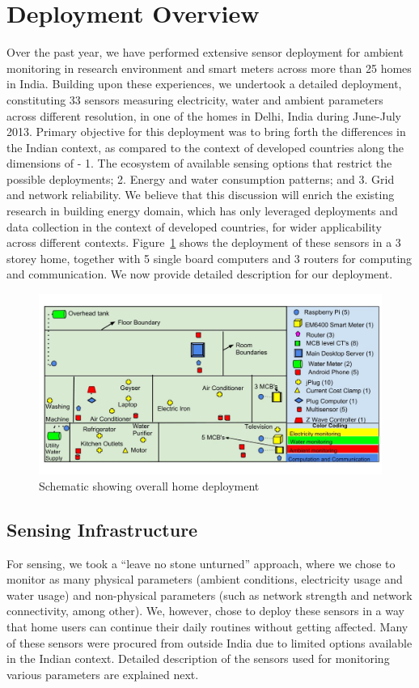\documentclass[10pt]{sensys-proc}
\newcommand{\figref}[1]{Figure~\ref{#1}}
\begin{document}
\section{Deployment Overview}
Over the past year, we have performed extensive sensor deployment for ambient monitoring in research environment and smart meters across more than 25 homes in India. Building upon these experiences, we undertook a detailed deployment, constituting 33 sensors measuring electricity, water and ambient parameters across different resolution, in one of the homes in Delhi, India during June-July 2013. Primary objective for this deployment was to bring forth the differences in the Indian context, as compared to the context of developed countries along the dimensions of - 1. The ecosystem of available sensing options that restrict the possible deployments; 2. Energy and water consumption patterns; and 3. Grid and network reliability. We believe that this discussion will enrich the existing research in building energy domain, which has only leveraged deployments and data collection in the context of developed countries, for wider applicability across different contexts. \figref{fig:overall} shows the deployment of these sensors in a 3 storey home, together with 5 single board computers and 3 routers for computing and communication. We now provide detailed description for our deployment.

\begin{figure}     
    \includegraphics[scale=0.19]{./figures/overall_deployment.jpg}
    \vspace{-6mm}    
    \caption{Schematic showing overall home deployment}   
    \label{fig:overall}
\end{figure}

\subsection{Sensing Infrastructure}
\label{sec:sensing}
For sensing, we took a ``leave no stone unturned'' approach, where  we chose to monitor as many physical parameters (ambient conditions, electricity usage and water usage) and non-physical parameters (such as network strength and network connectivity, among other). We, however, chose to deploy these sensors in a way that home users can continue their daily routines without getting affected. Many of these sensors were procured from outside India due to limited options available in the Indian context. Detailed description of the sensors used for monitoring various parameters are explained next.
\end{document}
